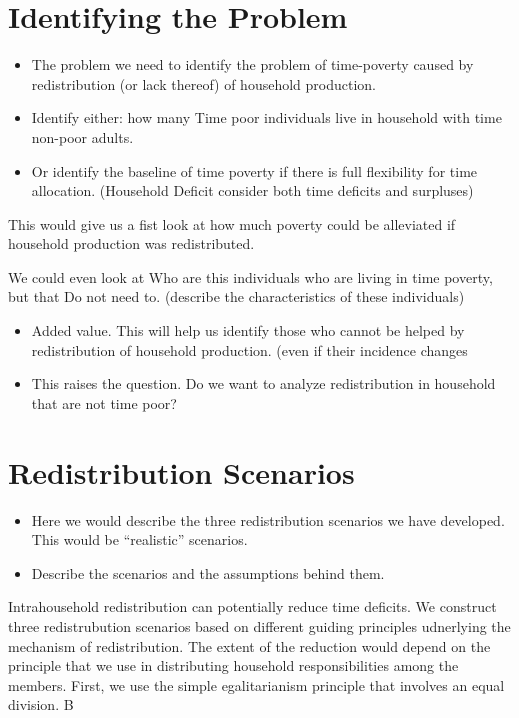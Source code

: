 \documentclass[
  11pt,
]{article}
\providecommand{\tightlist}{%
  \setlength{\itemsep}{0pt}\setlength{\parskip}{0pt}}\usepackage{longtable,booktabs,array}
\begin{document}
\section{Identifying the Problem}\label{identifying-the-problem}

\begin{itemize}
\tightlist
\item
  The problem we need to identify the problem of time-poverty caused by
  redistribution (or lack thereof) of household production.
\item
  Identify either: how many Time poor individuals live in household with
  time non-poor adults.
\item
  Or identify the baseline of time poverty if there is full flexibility
  for time allocation. (Household Deficit consider both time deficits
  and surpluses)
\end{itemize}

This would give us a fist look at how much poverty could be alleviated
if household production was redistributed.

We could even look at Who are this individuals who are living in time
poverty, but that Do not need to. (describe the characteristics of these
individuals)

\begin{itemize}
\item
  Added value. This will help us identify those who cannot be helped by
  redistribution of household production. (even if their incidence
  changes
\item
  This raises the question. Do we want to analyze redistribution in
  household that are not time poor?
\end{itemize}

\section{Redistribution Scenarios}\label{redistribution-scenarios}

\begin{itemize}
\item
  Here we would describe the three redistribution scenarios we have
  developed. This would be ``realistic'' scenarios.
\item
  Describe the scenarios and the assumptions behind them.
\end{itemize}

Intrahousehold redistribution can potentially reduce time deficits. We
construct three redistrubution scenarios based on different guiding
principles udnerlying the mechanism of redistribution. The extent of the
reduction would depend on the principle that we use in distributing
household responsibilities among the members. First, we use the simple
egalitarianism principle that involves an equal division. B
\end{document}
